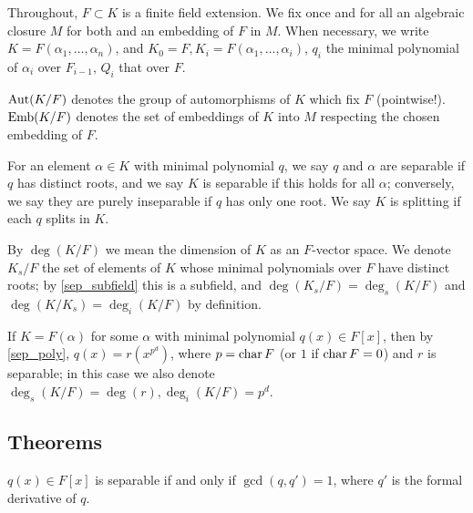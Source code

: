 Throughout, $F \subset K$ is a finite field extension.  We fix once and for
all an algebraic closure $M$ for both and an embedding of $F$ in $M$.  When
necessary, we write $K = F(\alpha_1, \dots, \alpha_n)$, and $K_0 = F, K_i =
F(\alpha_1, \dots, \alpha_i)$, $q_i$ the minimal polynomial of $\alpha_i$ over
$F_{i - 1}$, $Q_i$ that over $F$.

\begin{definition} $\operatorname{\text{Aut}}(K/F)$ denotes the group of automorphisms of $K$ which fix
$F$ (pointwise!).  $\operatorname{\text{Emb}}(K/F)$ denotes the set of embeddings of $K$ into $M$
respecting the chosen embedding of $F$.
\label{def:gal}
\end{definition}

\begin{definition} For an element $\alpha \in K$ with minimal polynomial $q$, we say
$q$ and $\alpha$ are separable if $q$ has distinct roots, and we say $K$ is
separable if this holds for all $\alpha$; conversely, we say they are purely
inseparable if $q$ has only one root.  We say $K$ is splitting if each $q$
splits in $K$.
\label{def:sepsplit}
\end{definition}

\begin{definition} By $\deg(K/F)$ we mean the dimension of $K$ as an $F$-vector
space.  We denote $K_s/F$ the set of elements of $K$ whose minimal polynomials
over $F$ have distinct roots; by \cref{sep_subfield} this is a subfield, and
$\deg(K_s/F) = \deg_s(K/F)$ and $\deg(K/K_s) = \deg_i(K/F)$ by definition.
\label{def:sep}
\end{definition}

\begin{definition} If $K = F(\alpha)$ for some $\alpha$ with minimal polynomial
$q(x) \in F[x]$, then by \cref{sep_poly}, $q(x) = r(x^{p^d})$, where $p =
\operatorname{\text{char}}{F}$ (or $1$ if $\operatorname{\text{char}}{F} = 0$) and $r$ is separable; in this case we
also denote $\deg_s(K/F) = \deg(r), \deg_i(K/F) = p^d$.  \label{def:prim_sep}
\end{definition}

\subsection{Theorems}

\begin{lemma} $q(x) \in F[x]$ is separable if and only if $\gcd(q, q') = 1$,
where $q'$ is the formal derivative of $q$. 
\label{der_poly}
\end{lemma}

